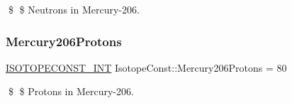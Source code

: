 \$ \$ Neutrons in Mercury-\/206. \mbox{\label{group___isotope_const-_mercury-_hg206_gaa23a1e5bdcfce95736666b71835bbb6d}} 
\subsubsection{\texorpdfstring{Mercury206\+Protons}{Mercury206Protons}}
{\footnotesize\ttfamily \mbox{\hyperlink{group___isotope_const-_macros_ga5f18360b3e99483a35c32d789e62621c}{I\+S\+O\+T\+O\+P\+E\+C\+O\+N\+S\+T\+\_\+\+I\+NT}} Isotope\+Const\+::\+Mercury206\+Protons = 80}

\$ \$ Protons in Mercury-\/206. 